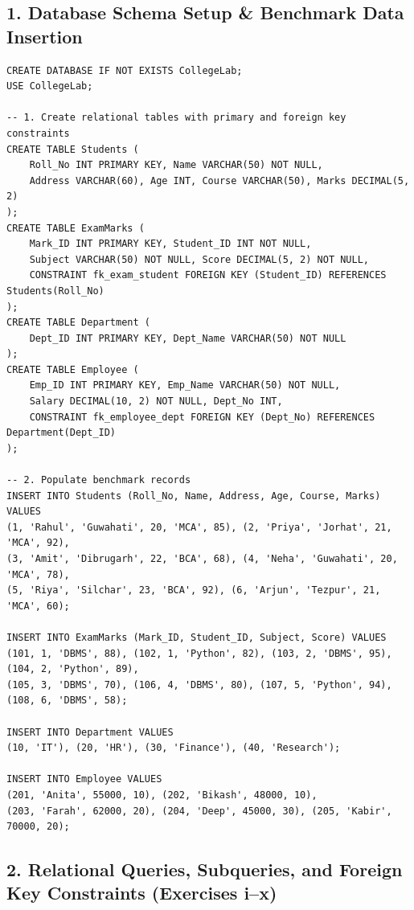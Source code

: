 \vspace{-0.15cm}
\subsection*{1. Database Schema Setup \& Benchmark Data Insertion}

\begin{lstlisting}[basicstyle=\ttfamily\scriptsize,caption={Creating CollegeLab schema and populating benchmark records}]
CREATE DATABASE IF NOT EXISTS CollegeLab;
USE CollegeLab;

-- 1. Create relational tables with primary and foreign key constraints
CREATE TABLE Students (
    Roll_No INT PRIMARY KEY, Name VARCHAR(50) NOT NULL,
    Address VARCHAR(60), Age INT, Course VARCHAR(50), Marks DECIMAL(5, 2)
);
CREATE TABLE ExamMarks (
    Mark_ID INT PRIMARY KEY, Student_ID INT NOT NULL,
    Subject VARCHAR(50) NOT NULL, Score DECIMAL(5, 2) NOT NULL,
    CONSTRAINT fk_exam_student FOREIGN KEY (Student_ID) REFERENCES Students(Roll_No)
);
CREATE TABLE Department (
    Dept_ID INT PRIMARY KEY, Dept_Name VARCHAR(50) NOT NULL
);
CREATE TABLE Employee (
    Emp_ID INT PRIMARY KEY, Emp_Name VARCHAR(50) NOT NULL,
    Salary DECIMAL(10, 2) NOT NULL, Dept_No INT,
    CONSTRAINT fk_employee_dept FOREIGN KEY (Dept_No) REFERENCES Department(Dept_ID)
);

-- 2. Populate benchmark records
INSERT INTO Students (Roll_No, Name, Address, Age, Course, Marks) VALUES
(1, 'Rahul', 'Guwahati', 20, 'MCA', 85), (2, 'Priya', 'Jorhat', 21, 'MCA', 92),
(3, 'Amit', 'Dibrugarh', 22, 'BCA', 68), (4, 'Neha', 'Guwahati', 20, 'MCA', 78),
(5, 'Riya', 'Silchar', 23, 'BCA', 92), (6, 'Arjun', 'Tezpur', 21, 'MCA', 60);

INSERT INTO ExamMarks (Mark_ID, Student_ID, Subject, Score) VALUES
(101, 1, 'DBMS', 88), (102, 1, 'Python', 82), (103, 2, 'DBMS', 95), (104, 2, 'Python', 89),
(105, 3, 'DBMS', 70), (106, 4, 'DBMS', 80), (107, 5, 'Python', 94), (108, 6, 'DBMS', 58);

INSERT INTO Department VALUES
(10, 'IT'), (20, 'HR'), (30, 'Finance'), (40, 'Research');

INSERT INTO Employee VALUES
(201, 'Anita', 55000, 10), (202, 'Bikash', 48000, 10),
(203, 'Farah', 62000, 20), (204, 'Deep', 45000, 30), (205, 'Kabir', 70000, 20);
\end{lstlisting}

\newpage

\subsection*{2. Relational Queries, Subqueries, and Foreign Key Constraints (Exercises i--x)}

